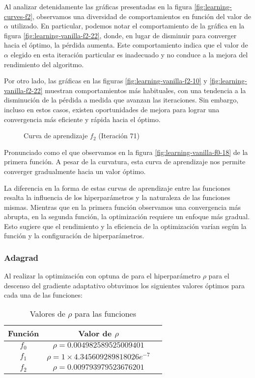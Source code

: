 Al analizar detenidamente las gráficas presentadas en la figura \ref{fig:learning-curves-f2}, observamos una diversidad de comportamientos en función del valor de $\alpha$ utilizado. En particular, podemos notar el comportamiento de la gráfica en la figura \ref{fig:learning-vanilla-f2-22}, donde, en lugar de disminuir para converger hacia el óptimo, la pérdida aumenta. Este comportamiento indica que el valor de $\alpha$ elegido en esta iteración particular es inadecuado y no conduce a la mejora del rendimiento del algoritmo.

Por otro lado, las gráficas en las figuras \ref{fig:learning-vanilla-f2-10} y \ref{fig:learning-vanilla-f2-22} muestran comportamientos más habituales, con una tendencia a la disminución de la pérdida a medida que avanzan las iteraciones. Sin embargo, incluso en estos casos, existen oportunidades de mejora para lograr una convergencia más eficiente y rápida hacia el óptimo.

\begin{figure}[h!]
  \centering
    
  \caption{Curva de aprendizaje $f_2$ (Iteración 71)}
  \captionsetup{justification=centering}
  \label{fig:learning-vanilla-f2-71}
\end{figure}

Pronunciado como el que observamos en la figura \ref{fig:learning-vanilla-f0-18} de la primera función. A pesar de la curvatura, esta curva de aprendizaje nos permite converger gradualmente hacia un valor óptimo.

La diferencia en la forma de estas curvas de aprendizaje entre las funciones resalta la influencia de los hiperparámetros y la naturaleza de las funciones mismas. Mientras que en la primera función observamos una convergencia más abrupta, en la segunda función, la optimización requiere un enfoque más gradual. Esto sugiere que el rendimiento y la eficiencia de la optimización varían según la función y la configuración de hiperparámetros.
\newpage

\subsubsection{Adagrad}
Al realizar la optimización con optuna de para el hiperparámetro $\rho$ para el descenso del gradiente adaptativo obtuvimos los siguientes valores óptimos para cada una de las funciones: 
\begin{table}[H]
    \centering
    \caption{Valores de $\rho$ para las funciones}
    \begin{tabular}{|c|c|c|}
    \hline
    \textbf{Función} & \textbf{Valor de $\rho$} \\
    \hline
    $f_0$ & $\rho = 0.004982589525009401$ \\
    \hline
    $f_1$ & $\rho = 1 \times 4.345609289818026e^{-7}$ \\
    \hline
    $f_2$ & $\rho =  0.009793979523676201$ \\
    \hline
    \end{tabular}
    \label{tab:valores-rho-adaptativo}
\end{table}


